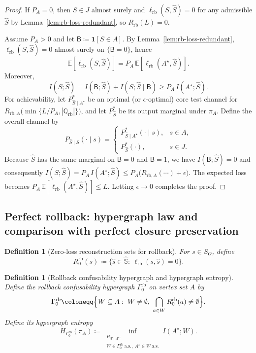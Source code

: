 \documentclass[twoside]{article}
\newtheorem{definition}[theorem]{Definition}
\newcommand{\E}{\mathbb{E}}
\newcommand{\1}{\mathbf{1}}
\begin{document}
\begin{proof}
If \(P_A=0\), then \(S\in J\) almost surely and \(\ell_{\mathrm{rb}}(S,\hat S)=0\) for any admissible \(\hat S\) by
Lemma~\ref{lem:rb-loss-redundant}, so \(R_{\mathrm{rb}}(L)=0\).

Assume \(P_A>0\) and let \(\mathsf B\coloneqq \1[S\in A]\). By Lemma~\ref{lem:rb-loss-redundant},
\(\ell_{\mathrm{rb}}(S,\hat S)=0\) almost surely on \(\{\mathsf B=0\}\), hence
\[
\E[\ell_{\mathrm{rb}}(S,\hat S)]
= P_A\,\E[\ell_{\mathrm{rb}}(A^\star,\hat S)].
\]
Moreover,
\[
I(S;\hat S)=I(\mathsf B;\hat S)+I(S;\hat S\mid \mathsf B)\ge P_A\,I(A^\star;\hat S).
\]
For achievability, let \(P_{\hat S\mid A^\star}^*\) be an optimal (or \(\epsilon\)-optimal)
core test channel for \(R_{\mathrm{rb},A}\bigl(\min\{L/P_A,|\mathbb Q_{\mathrm{rb}}|\}\bigr)\),
and let \(P_{\hat S}^*\) be its output marginal under \(\pi_A\).  Define the overall channel by
\[
P_{\hat S\mid S}(\cdot\mid s)=
\begin{cases}
P_{\hat S\mid A^\star}^*(\cdot\mid s), & s\in A,\\
P_{\hat S}^*(\cdot), & s\in J .
\end{cases}
\]
Because \(\hat S\) has the same marginal on \(\mathsf B=0\) and \(\mathsf B=1\), we have
\(I(\mathsf B;\hat S)=0\) and consequently
\(I(S;\hat S)=P_A\,I(A^\star;\hat S)\le P_A\bigl(R_{\mathrm{rb},A}(\cdots)+\epsilon\bigr)\).
The expected loss becomes \(P_A\,\E[\ell_{\mathrm{rb}}(A^\star,\hat S)]\le L\).
Letting \(\epsilon\to0\) completes the proof.


\end{proof}

\subsection{Perfect rollback: hypergraph law and comparison with perfect closure preservation}
\label{sec:rb-zero}

\begin{definition}[Zero-loss reconstruction sets for rollback]
\label{def:rb-zero-set}
For \(s\in S_O\), define
\[
R^{\mathrm{rb}}_0(s)\coloneqq \{\hat s\in\hat{\mathbb{S}}:\ \ell_{\mathrm{rb}}(s,\hat s)=0\}.
\]
\end{definition}

\begin{definition}[Rollback confusability hypergraph and hypergraph entropy]
\label{def:gamma0-rb}
Define the rollback confusability hypergraph \(\Gamma^{\mathrm{rb}}_0\) on vertex set \(A\) by
\[
\Gamma^{\mathrm{rb}}_0 \coloneqq \Bigl\{ W\subseteq A:\ W\neq\emptyset,\ \bigcap_{a\in W}R^{\mathrm{rb}}_0(a)\neq\emptyset \Bigr\}.
\]
Define its hypergraph entropy
\[
H_{\Gamma^{\mathrm{rb}}_0}(\pi_A)\coloneqq 
\inf_{\substack{P_{W\mid A^\star}:\\ W\in\Gamma^{\mathrm{rb}}_0\ \text{a.s.},\ A^\star\in W\ \text{a.s.}}}
I(A^\star;W).
\]
\end{definition}
\end{document}
